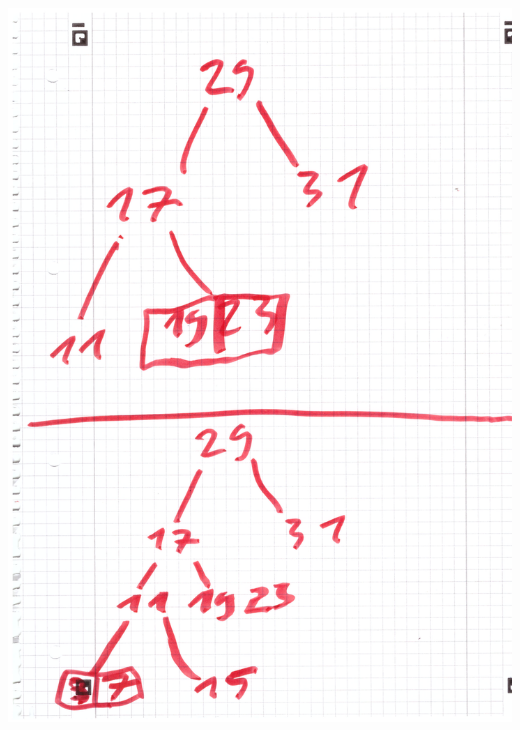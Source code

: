 \documentclass{article}
\begin{document}
	\includegraphics[width=\linewidth]{A10202}
\end{document}

